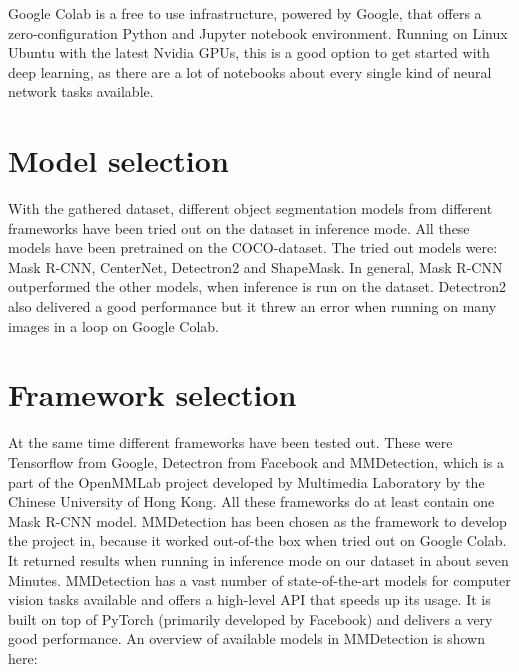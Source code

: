 Google Colab is a free to use infrastructure, powered by Google, that offers a zero-configuration Python and Jupyter notebook environment. Running on Linux Ubuntu with the latest Nvidia GPUs, this is a good option to get started with deep learning, as there are a lot of notebooks about every single kind of neural network tasks available.

\section{Model selection}

With the gathered dataset, different object segmentation models from different frameworks have been tried out on the dataset in inference mode. All these models have been pretrained on the COCO-dataset.
The tried out models were: Mask R-CNN, CenterNet, Detectron2 and ShapeMask. In general, Mask R-CNN outperformed the other models, when inference is run on the dataset. Detectron2 also delivered a good performance but it threw an error when running on many images in a loop on Google Colab.

\section{Framework selection}

At the same time different frameworks have been tested out. These were Tensorflow from Google, Detectron from Facebook and MMDetection, which is a part of the OpenMMLab project developed by Multimedia Laboratory by the Chinese University of Hong Kong. All these frameworks do at least contain one Mask R-CNN model. MMDetection has been chosen as the framework to develop the project in, because it worked out-of-the box when tried out on Google Colab. It returned results when running in inference mode on our dataset in about seven Minutes. MMDetection has a vast number of state-of-the-art models for computer vision tasks available and offers a high-level API that speeds up its usage. It is built on top of PyTorch (primarily developed by Facebook) and delivers a very good performance. An overview of available models in MMDetection is shown here:

